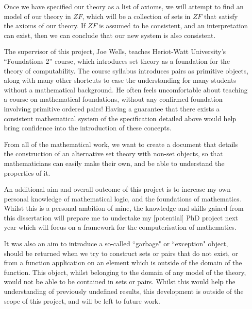 \documentclass[11pt]{report}
\theoremstyle{definition}
\theoremstyle{theorem}
\theoremstyle{lemma}
\begin{document}
Once we have specified our theory as a list of axioms, we will attempt to find an model of our theory in $\mathit{ZF}$, which will be a collection of sets in $\mathit{ZF}$ that satisfy the axioms of our theory.
If $\mathit{ZF}$ is assumed to be consistent, and an interpretation can exist, then we can conclude that our new system is also consistent.

The supervisor of this project, Joe Wells, teaches Heriot-Watt University's ``Foundations 2'' course, which introduces set theory as a foundation for the theory of computability.
The course syllabus introduces pairs as primitive objects, along with many other shortcuts to ease the understanding for many students without a mathematical background.  
He often feels uncomfortable about teaching a course on mathematical foundations, without any confirmed foundation involving primitive ordered pairs! 
Having a guarantee that there exists a consistent mathematical system of the specification detailed above would help bring confidence into the introduction of these concepts.

From all of the mathematical work, we want to create a document that details the construction of an alternative set theory with non-set objects, so that mathematicians can easily make their own, and be able to understand the properties of it.

An additional aim and overall outcome of this project is to increase my own personal knowledge of mathematical logic, and the foundations of mathematics.
Whilst this is a personal ambition of mine, the knowledge and skills gained from this dissertation will prepare me to undertake my [potential] PhD project next year which will focus on a framework for the computerisation of mathematics.

It was also an aim to introduce a so-called ``garbage" or ``exception" object, should be returned when we try to construct sets or pairs that do not exist, or from a function application on an element which is outside of the domain of the function.
This object, whilst belonging to the domain of any model of the theory, would not be able to be contained in sets or pairs.
Whilst this would help the understanding of previously undefined results, this development is outside of the scope of this project, and will be left to future work.
\end{document}
